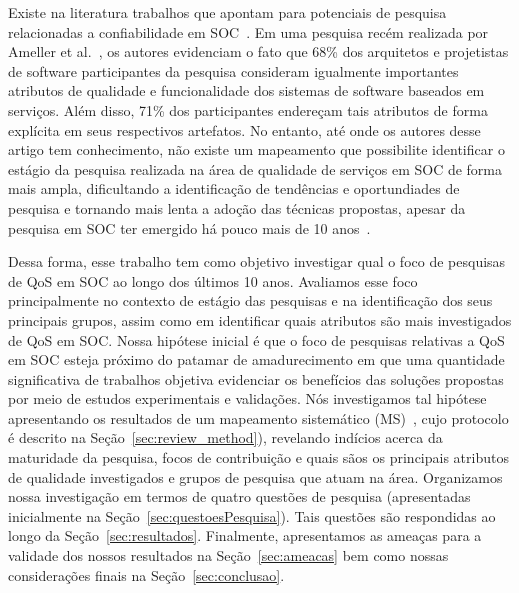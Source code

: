 Existe na literatura trabalhos que apontam para potenciais de pesquisa relacionadas a confiabilidade em SOC~\cite{4797931}. Em uma pesquisa rec\'{e}m realizada por Ameller et al.~\cite{Ameller2013-ECSA}, os autores evidenciam o fato que 68\% dos arquitetos e projetistas de software participantes da pesquisa consideram igualmente importantes atributos de qualidade e funcionalidade dos sistemas de software baseados em servi\c{c}os. Al\'{e}m disso, 71\% dos participantes endere\c{c}am tais atributos de forma expl\'{i}cita em seus respectivos artefatos. No entanto, at\'{e} onde os autores desse artigo tem conhecimento, n\~{a}o existe um mapeamento que possibilite identificar o est\'{a}gio da pesquisa realizada na \'{a}rea de qualidade de servi\c cos em SOC de forma mais ampla, dificultando a identifica\c c\~{a}o de tend\^{e}ncias e oportundiades de pesquisa e tornando mais lenta a ado\c c\~{a}o das t\'{e}cnicas propostas, apesar da pesquisa em SOC ter emergido h\'{a} pouco mais de 10 anos~\cite{papazoglou:cacm2003}.

Dessa forma, esse trabalho tem como objetivo investigar qual o foco de pesquisas de QoS em SOC ao longo dos \'{u}ltimos 10 anos. Avaliamos esse foco principalmente no contexto de est\'{a}gio das pesquisas e na identifica\c{c}\~{a}o dos seus principais grupos, assim como em identificar quais atributos s\~{a}o mais investigados de QoS em SOC. Nossa hip\'{o}tese inicial \'{e} que o foco de pesquisas relativas a QoS em SOC esteja próximo do patamar de amadurecimento em que uma quantidade significativa de trabalhos objetiva evidenciar os benef\'{i}cios das solu\c c\~{o}es propostas por meio de estudos experimentais e valida\c c\~{o}es. N\'{o}s investigamos tal hip\'{o}tese apresentando os resultados de um mapeamento sistem\'{a}tico (MS)~\cite{petersen:sms2008}, cujo protocolo \'{e} descrito na Seção~\ref{sec:review_method}), revelando indícios acerca da maturidade da pesquisa, focos de contribuição e quais s\~{a}os os principais atributos de qualidade investigados e grupos de pesquisa que atuam na \'{a}rea. 
Organizamos nossa investiga\c{c}\~{a}o em termos de quatro quest\~{o}es de pesquisa (apresentadas inicialmente na Seção~\ref{sec:questoesPesquisa}). Tais questões são respondidas ao longo da Se\c c\~{a}o~\ref{sec:resultados}. Finalmente, apresentamos as amea\c cas para 
a validade dos nossos resultados na Se\c c\~{a}o~\ref{sec:ameacas} bem como nossas considera\c c\~{o}es finais na Se\c c\~{a}o~\ref{sec:conclusao}. 

 

